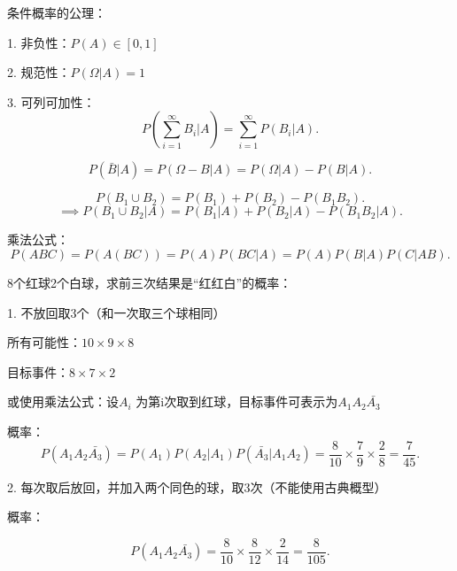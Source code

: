 \begin{axiom}
    条件概率的公理：

    1. 非负性：$P\left( A \right) \in \left[ 0,1 \right] $

    2. 规范性：$P\left( \Omega|A \right) =1$

    3. 可列可加性： \[
        P\left( \sum_{i=1}^{\infty} B_i|A \right) =\sum_{i=1}^{\infty} P\left( B_i|A \right) 
    .\] 
\end{axiom}
\begin{cor}
    \[
        P\left( \bar{B}|A \right) =P\left( \Omega-B|A \right) =P\left( \Omega|A \right) -P\left( B|A \right)
    .\] 
\end{cor}
\begin{cor}
    \[
        P\left( B_1\cup B_2 \right) =P\left( B_1 \right) +P\left( B_2 \right) -P\left( B_1B_2 \right) 
    .\] 
    \[
        \implies P\left( B_1\cup B_2|A \right) =P\left( B_1|A \right) +P\left( B_2|A \right) -P\left( B_1B_2|A \right) 
    .\] 
\end{cor}
\begin{cor}
    乘法公式：
    \[
        P\left( ABC \right) =P\left( A\left( BC \right)  \right) =P\left( A \right) P\left( BC|A \right) =P\left( A \right) P\left( B|A\right) P\left( C|AB \right)  
    .\] 
\end{cor}
\begin{eg}
    8个红球2个白球，求前三次结果是“红红白”的概率：

    1. 不放回取3个（和一次取三个球相同）

    所有可能性：$10\times 9\times 8$ 

    目标事件：$8\times 7\times 2$

    或使用乘法公式：设$A_i$ 为第i次取到红球，目标事件可表示为$A_1A_2\bar{A_3}$

    概率：\[
        P\left( A_1A_2\bar{A_3} \right) =P\left( A_1 \right) P\left( A_2|A_1 \right) P\left( \bar{A_3}|A_1A_2 \right) =\frac{8}{10}\times \frac{7}{9}\times \frac{2}{8}=\frac{7}{45}
    .\] 

    2. 每次取后放回，并加入两个同色的球，取3次（不能使用古典概型）

    概率：

    \[
        P\left( A_1A_2\bar{A_3} \right) =\frac{8}{10}\times \frac{8}{12}\times \frac{2}{14}=\frac{8}{105}
    .\] 
\end{eg}



